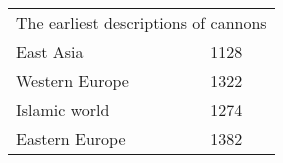 \begin{table}[h]
\begin{tabular}{ll}
\multicolumn{2}{l}{The earliest descriptions of cannons} \\
East Asia                    & 1128               \\
Western Europe               & 1322               \\
Islamic world                & 1274               \\
Eastern Europe               & 1382              
\end{tabular}
\label{tab:cn}
\end{table}